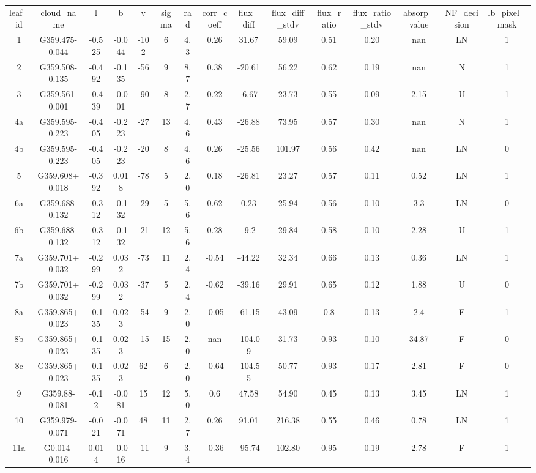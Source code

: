 \begin{table}
\begin{tabular}{ccccccccccccccc}
leaf_id & cloud_name & l & b & v & sigma & rad & corr_coeff & flux_diff & flux_diff_stdv & flux_ratio & flux_ratio_stdv & absorp_value & NF_decision & lb_pixel_mask \\
1 & G359.475-0.044 & -0.525 & -0.044 & -102 & 6 & 4.3 & 0.26 & 31.67 & 59.09 & 0.51 & 0.20 & nan & LN & 1 \\
2 & G359.508-0.135 & -0.492 & -0.135 & -56 & 9 & 8.7 & 0.38 & -20.61 & 56.22 & 0.62 & 0.19 & nan & N & 1 \\
3 & G359.561-0.001 & -0.439 & -0.001 & -90 & 8 & 2.7 & 0.22 & -6.67 & 23.73 & 0.55 & 0.09 & 2.15 & U & 1 \\
4a & G359.595-0.223 & -0.405 & -0.223 & -27 & 13 & 4.6 & 0.43 & -26.88 & 73.95 & 0.57 & 0.30 & nan & N & 1 \\
4b & G359.595-0.223 & -0.405 & -0.223 & -20 & 8 & 4.6 & 0.26 & -25.56 & 101.97 & 0.56 & 0.42 & nan & LN & 0 \\
5 & G359.608+0.018 & -0.392 & 0.018 & -78 & 5 & 2.0 & 0.18 & -26.81 & 23.27 & 0.57 & 0.11 & 0.52 & LN & 1 \\
6a & G359.688-0.132 & -0.312 & -0.132 & -29 & 5 & 5.6 & 0.62 & 0.23 & 25.94 & 0.56 & 0.10 & 3.3 & LN & 0 \\
6b & G359.688-0.132 & -0.312 & -0.132 & -21 & 12 & 5.6 & 0.28 & -9.2 & 29.84 & 0.58 & 0.10 & 2.28 & U & 1 \\
7a & G359.701+0.032 & -0.299 & 0.032 & -73 & 11 & 2.4 & -0.54 & -44.22 & 32.34 & 0.66 & 0.13 & 0.36 & LN & 1 \\
7b & G359.701+0.032 & -0.299 & 0.032 & -37 & 5 & 2.4 & -0.62 & -39.16 & 29.91 & 0.65 & 0.12 & 1.88 & U & 0 \\
8a & G359.865+0.023 & -0.135 & 0.023 & -54 & 9 & 2.0 & -0.05 & -61.15 & 43.09 & 0.8 & 0.13 & 2.4 & F & 1 \\
8b & G359.865+0.023 & -0.135 & 0.023 & -15 & 15 & 2.0 & nan & -104.09 & 31.73 & 0.93 & 0.10 & 34.87 & F & 0 \\
8c & G359.865+0.023 & -0.135 & 0.023 & 62 & 6 & 2.0 & -0.64 & -104.55 & 50.77 & 0.93 & 0.17 & 2.81 & F & 0 \\
9 & G359.88-0.081 & -0.12 & -0.081 & 15 & 12 & 5.0 & 0.6 & 47.58 & 54.90 & 0.45 & 0.13 & 3.45 & LN & 1 \\
10 & G359.979-0.071 & -0.021 & -0.071 & 48 & 11 & 2.7 & 0.26 & 91.01 & 216.38 & 0.55 & 0.46 & 0.78 & LN & 1 \\
11a & G0.014-0.016 & 0.014 & -0.016 & -11 & 9 & 3.4 & -0.36 & -95.74 & 102.80 & 0.95 & 0.19 & 2.78 & F & 1 \\

\end{tabular}
\end{table}
